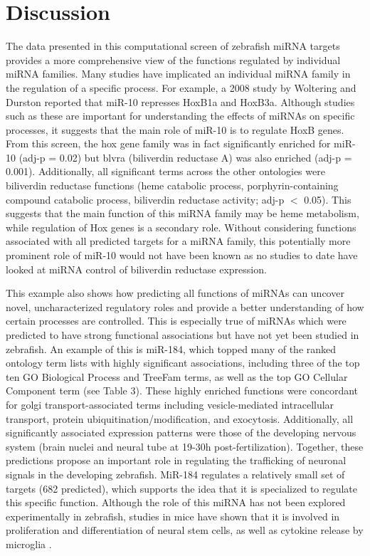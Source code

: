 \documentclass[12pt]{article}
\begin{document}
\section{   Discussion}
The data presented in this computational screen of zebrafish miRNA targets provides a more comprehensive view of the functions regulated by individual miRNA families. Many studies have implicated an individual miRNA family in the regulation of a specific process. For example, a 2008 study by Woltering and Durston reported that miR-10 represses HoxB1a and HoxB3a. Although studies such as these are important for understanding the effects of miRNAs on specific processes, it suggests that the main role of miR-10 is to regulate HoxB genes. From this screen, the hox gene family was in fact significantly enriched for miR-10 (adj-p = 0.02) but blvra (biliverdin reductase A) was also enriched (adj-p = 0.001). Additionally, all significant terms across the other ontologies were biliverdin reductase functions (heme catabolic process, porphyrin-containing compound catabolic process, biliverdin reductase activity; adj-p $<$ 0.05). This suggests that the main function of this miRNA family may be heme metabolism, while regulation of Hox genes is a secondary role. Without considering functions associated with all predicted targets for a miRNA family, this potentially more prominent role of miR-10 would not have been known as no studies to date have looked at miRNA control of biliverdin reductase expression.

This example also shows how predicting all functions of miRNAs can uncover novel, uncharacterized regulatory roles and provide a better understanding of how certain processes are controlled. This is especially true of miRNAs which were predicted to have strong functional associations but have not yet been studied in zebrafish. An example of this is miR-184, which topped many of the ranked ontology term lists with highly significant associations, including three of the top ten GO Biological Process and TreeFam terms, as well as the top GO Cellular Component term (see Table 3). These highly enriched functions were concordant for golgi transport-associated terms including vesicle-mediated intracellular transport, protein ubiquitination/modification, and exocytosis. Additionally, all significantly associated expression patterns were those of the developing nervous system (brain nuclei and neural tube at 19-30h post-fertilization). Together, these predictions propose an important role in regulating the trafficking of neuronal signals in the developing zebrafish. MiR-184 regulates a relatively small set of targets (682 predicted), which supports the idea that it is specialized to regulate this specific function. Although the role of this miRNA has not been explored experimentally in zebrafish, studies in mice have shown that it is involved in proliferation and differentiation of neural stem cells, as well as cytokine release by microglia \cite{liu2010epigenetic, danis2016differential}.
\end{document}
